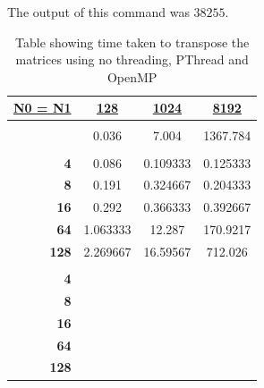 \documentclass[10pt, conference]{IEEEtran}
\begin{document}
The output of this command was $38255$.

\begin{table}[h!]
\centering
\caption{Table showing time taken to transpose the matrices using no threading, PThread and OpenMP}
\label{Results}
\begin{tabular}{|r|c|c|c|}
\hline
\multicolumn{1}{|l|}{{\ul \textbf{N0 = N1}}} & {\ul \textbf{128}} & {\ul \textbf{1024}} & {\ul \textbf{8192}} \\ \hline
\multicolumn{4}{|c|}{\cellcolor[HTML]{C0C0C0}{\ul \textbf{No threading}}}                                     \\ \hline
\multicolumn{1}{|c|}{}                       & 0.036              & 7.004               & 1367.784            \\ \hline
\multicolumn{4}{|c|}{\cellcolor[HTML]{C0C0C0}{\ul \textbf{PThread}}}                                          \\ \hline
\textbf{4}                                   & 0.086              & 0.109333            & 0.125333            \\ \hline
\textbf{8}                                   & 0.191              & 0.324667            & 0.204333            \\ \hline
\textbf{16}                                  & 0.292              & 0.366333            & 0.392667            \\ \hline
\textbf{64}                                  & 1.063333           & 12.287              & 170.9217            \\ \hline
\textbf{128}                                 & 2.269667           & 16.59567            & 712.026             \\ \hline
\multicolumn{4}{|c|}{\cellcolor[HTML]{C0C0C0}{\ul \textbf{OpenMP}}}                                           \\ \hline
\textbf{4}                                   &                    &                     &                     \\ \hline
\textbf{8}                                   &                    &                     &                     \\ \hline
\textbf{16}                                  &                    &                     &                     \\ \hline
\textbf{64}                                  &                    &                     &                     \\ \hline
\textbf{128}                                 &                    &                     &                     \\ \hline
\end{tabular}
\end{table}
\end{document}
